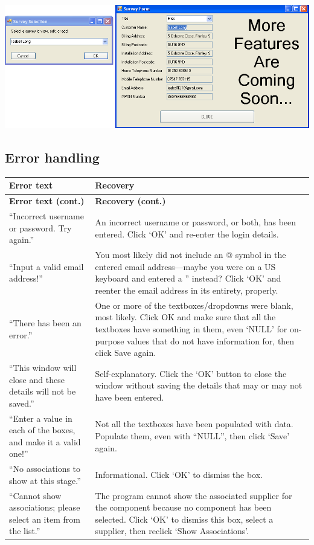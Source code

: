 		\includegraphics[scale=0.25]{survey-IL-select_scrot}

	\subsection{Error handling}
			\begin{longtable} { | p{6cm} | p{6cm} | }
		\hline
		\textbf{Error text} & \textbf{Recovery}\\
		\endfirsthead		
		\hline
		\textbf{Error text (cont.)} & \textbf{Recovery (cont.)}\\
		\endhead
		\hline
		``Incorrect username or password.  Try again.'' & An incorrect username or password, or both, has been entered.  Click `OK' and re-enter the login details.\\
		\hline
		``Input a valid email address!'' & You most likely did not include an @ symbol in the entered email address---maybe you were on a US keyboard and entered a '' instead?  Click `OK' and reenter the email address in its entirety, properly.\\
		\hline
		``There has been an error.'' & One or more of the textboxes\slash dropdowns were blank, most likely.  Click OK and make sure that all the textboxes have something in them, even `NULL' for on-purpose values that do not have information for, then click Save again.\\
		\hline
		``This window will close and these details will not be saved.'' & Self-explanatory.  Click the `OK' button to close the window without saving the details that may or may not have been entered.\\
		\hline
		``Enter a value in each of the boxes, and make it a valid one!'' & Not all the textboxes have been populated with data.  Populate them, even with ``NULL'', then click `Save' again.\\
		\hline
		``No associations to show at this stage.'' & Informational.  Click `OK' to dismiss the box.\\
		\hline
		``Cannot show associations; please select an item from the list.'' & The program cannot show the associated supplier for the component because no component has been selected.  Click `OK' to dismiss this box, select a supplier, then reclick `Show Associations'.\\

\end{longtable}
